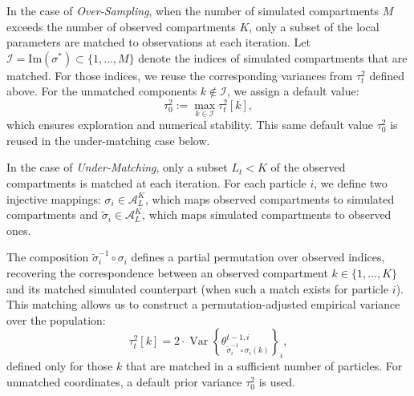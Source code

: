 \documentclass[lineno]{biometrika}
\begin{document}
In the case of \emph{Over-Sampling}, when the number of simulated compartments \( M \) exceeds the number of observed compartments \( K \), only a subset of the local parameters are matched to observations at each iteration. Let \( \mathcal{I} = \mathrm{Im}(\sigma^*) \subset \{1, \dots, M\} \) denote the indices of simulated compartments that are matched. For those indices, we reuse the corresponding variances from \( \tau_t^2 \) defined above. For the unmatched components \( k \notin \mathcal{I} \), we assign a default value:
\[
\tau_0^2 := \max_{k \in \mathcal{I}} \tau_t^2[k],
\]
which ensures exploration and numerical stability. This same default value \( \tau_0^2 \) is reused in the under-matching case below.





In the case of \emph{Under-Matching}, only a subset \( L_t < K \) of the observed compartments is matched at each iteration. For each particle \( i \), we define two injective mappings: \( \sigma_i \in \mathcal{A}_L^K \), which maps observed compartments to simulated compartments and \( \tilde{\sigma}_i \in \mathcal{A}_L^K \), which maps simulated compartments to observed ones.

The composition \( \tilde{\sigma}_i^{-1} \circ \sigma_i \) defines a partial permutation over observed indices, recovering the correspondence between an observed compartment \( k \in \{1, \dots, K\} \) and its matched simulated counterpart (when such a match exists for particle \( i \)). This matching allows us to construct a permutation-adjusted empirical variance over the population:
\[
\tau_t^2[k] = 2 \cdot \operatorname{Var} \left\{ \theta^{t-1,i}_{\tilde{\sigma}_i^{-1} \circ \sigma_i(k)} \right\}_i,
\]
defined only for those \( k \) that are matched in a sufficient number of particles. For unmatched coordinates, a default prior variance \( \tau_0^2 \) is used.


\end{document}
